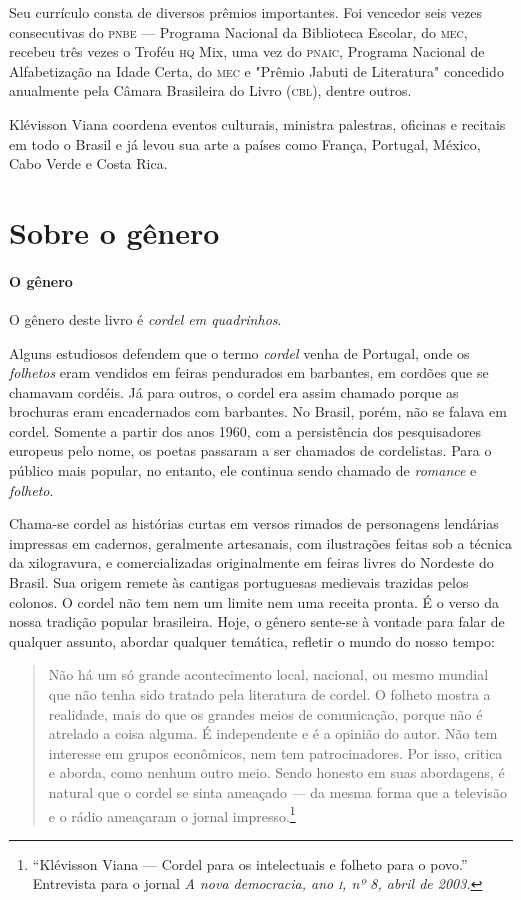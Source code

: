 \documentclass[11pt]{extarticle}
\begin{document}
Seu currículo consta de diversos prêmios importantes. Foi vencedor seis vezes consecutivas do 
\textsc{pnbe} --- Programa Nacional da Biblioteca Escolar, do \textsc{mec}, recebeu três 
vezes o Troféu \textsc{hq} Mix, uma vez do \textsc{pnaic}, Programa Nacional de Alfabetização 
na Idade Certa, do \textsc{mec} e "Prêmio Jabuti de Literatura" concedido anualmente pela 
Câmara Brasileira do Livro (\textsc{cbl}), dentre outros. 

Klévisson Viana coordena eventos culturais, ministra palestras, oficinas e recitais em 
todo o Brasil e já levou sua arte a países como França, Portugal, México, Cabo Verde e Costa Rica. 


\section{Sobre o gênero}

\paragraph{O gênero} O gênero deste livro é \textit{cordel em quadrinhos}. 


Alguns estudiosos defendem que o termo \textit{cordel} venha de Portugal, onde os \textit{folhetos} 
eram vendidos em feiras pendurados em barbantes, em cordões que se chamavam cordéis. Já para
outros, o cordel era assim chamado porque as brochuras eram encadernados com barbantes. 
No Brasil, porém, não se falava em cordel. Somente a partir dos anos 1960, com a persistência 
dos pesquisadores europeus pelo nome, os poetas passaram a ser chamados de 
cordelistas. Para o público mais popular, no entanto, ele continua sendo chamado de \textit{romance} e 
\textit{folheto}.

Chama-se cordel as histórias curtas em versos rimados de personagens 
lendárias impressas em cadernos, geralmente artesanais, com ilustrações feitas sob a técnica da 
xilogravura, e comercializadas originalmente em feiras livres do Nordeste do Brasil. 
Sua origem remete às cantigas portuguesas medievais trazidas pelos colonos.
O cordel não tem nem um limite nem uma receita pronta. É o verso da 
nossa tradição popular brasileira. Hoje, o gênero sente-se à vontade para falar de qualquer 
assunto, abordar qualquer temática, refletir o mundo do nosso tempo:

\begin{quote}
Não há um só grande acontecimento local, nacional, ou mesmo mundial que não tenha sido tratado 
pela literatura de cordel. O folheto mostra a realidade, mais do que os grandes meios de comunicação, 
porque não é atrelado a coisa alguma. É independente e é a opinião do autor. Não tem interesse em 
grupos econômicos, nem tem patrocinadores. Por isso, critica e aborda, como nenhum outro meio. 
Sendo honesto em suas abordagens, é natural que o cordel se sinta ameaçado --- da mesma forma que 
a televisão e o rádio ameaçaram o jornal impresso.\footnote{``Klévisson Viana --- Cordel para os intelectuais e folheto para o povo.'' Entrevista para o jornal \textit{A nova democracia, ano \textsc{i}, nº 8, abril de 2003.}}
\end{quote}
\end{document}
